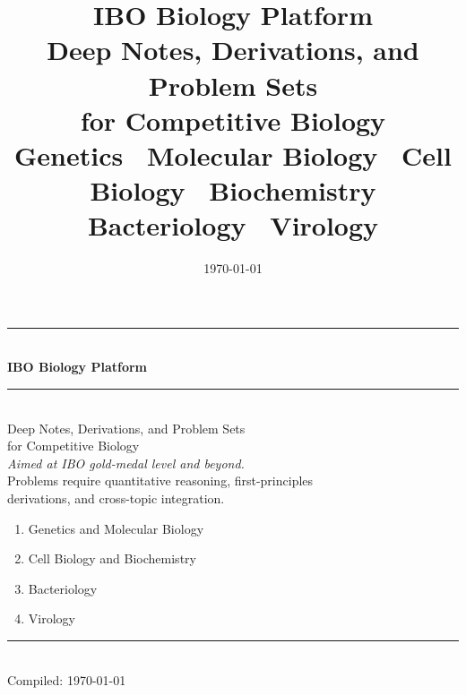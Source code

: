 \documentclass[12pt, a4paper, twoside, openright]{book}
\title{%
  \vspace{-2cm}
  {\sffamily\Huge\bfseries\color{IBOblue} IBO Biology Platform}\\[0.6em]
  {\sffamily\Large\color{IBOteal}
    Deep Notes, Derivations, and Problem Sets\\
    for Competitive Biology}\\[1em]
  {\sffamily\normalsize\color{gray}
    Genetics \textbullet\ Molecular Biology \textbullet\
    Cell Biology \textbullet\ Biochemistry\\
    Bacteriology \textbullet\ Virology}%
}
\author{}
\date{\sffamily\today}
\begin{document}

\begin{titlepage}
  \centering
  \vspace*{2cm}

  {\color{IBOblue}\rule{\textwidth}{2pt}}\\[0.8em]

  {\sffamily\fontsize{36}{42}\selectfont\bfseries\color{IBOblue}
    IBO Biology Platform}\\[0.5em]

  {\color{IBOblue}\rule{\textwidth}{0.6pt}}\\[0.8em]

  {\sffamily\Large\color{IBOteal}
    Deep Notes, Derivations, and Problem Sets\\
    for Competitive Biology}\\[2em]

  {\sffamily\normalsize\color{gray}
    \textit{Aimed at IBO gold-medal level and beyond.}\\[0.3em]
    Problems require quantitative reasoning, first-principles\\
    derivations, and cross-topic integration.}

  \vfill

  \begin{tcolorbox}[
    colback=lightblue, colframe=IBOblue,
    width=0.75\textwidth,
    title={\sffamily\bfseries Modules},
    fonttitle=\color{white}
  ]
    \begin{enumerate}[label=\textbf{\arabic*.}, leftmargin=1.5em]
      \item Genetics and Molecular Biology
      \item Cell Biology and Biochemistry
      \item Bacteriology
      \item Virology
    \end{enumerate}
  \end{tcolorbox}

  \vfill

  {\color{IBOblue}\rule{\textwidth}{2pt}}\\[0.5em]
  {\sffamily\small\color{gray} Compiled: \today}
\end{titlepage}

\frontmatter
\tableofcontents
\listoffigures
\lstlistoflistings
\end{document}
